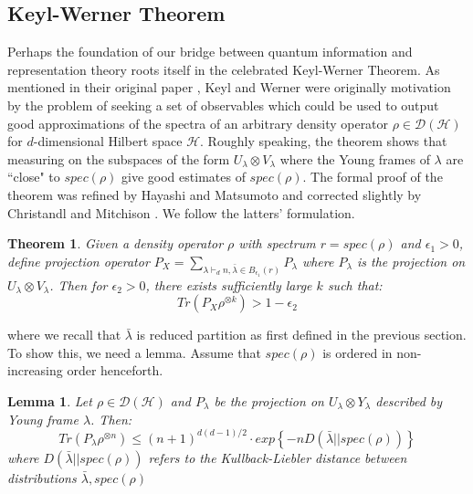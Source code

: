 \documentclass[12pt]{article}%
\newtheorem{thm}{Theorem}
\newtheorem{lemma}{Lemma}
\begin{document}
\subsection{Keyl-Werner Theorem}
Perhaps the foundation of our bridge between quantum information and representation theory roots itself in the celebrated Keyl-Werner Theorem. As mentioned in their original paper \cite{KW}, Keyl and Werner were originally motivation by the problem of seeking a set of observables which could be used to output good approximations of the spectra of an arbitrary density operator $\rho \in \mathcal{D}(\mathcal{H})$ for $d$-dimensional Hilbert space $\mathcal{H}$.  Roughly speaking, the theorem shows that measuring on the subspaces of the form $U_\lambda \otimes V_\lambda$ where the Young frames of $\lambda$ are ``close" to $spec(\rho)$ give good estimates of $spec(\rho)$. The formal proof of the theorem was refined by Hayashi and Matsumoto \cite{HM} and corrected slightly by Christandl and Mitchison \cite{CM}. We follow the latters' formulation.

\begin{thm} \label{keyl}
  Given a density operator $\rho$ with spectrum $r  = spec(\rho)$ and $\epsilon_1 > 0$, define projection operator $P_X = \sum_{\lambda \vdash_d n, \bar{\lambda} \in B_{\epsilon_1}(r)} P_{\lambda}$ where $P_{\lambda}$ is the projection on $U_{\lambda} \otimes V_{\lambda}$. Then for $\epsilon_2 > 0$, there exists sufficiently large $k$ such that:
  $$  Tr(P_X \rho^{\otimes k}) > 1 - \epsilon_2$$
\end{thm}

\noindent where we recall that $\bar{\lambda}$ is reduced partition as first defined in the previous section. To show this, we need a lemma.  Assume that $spec(\rho)$ is ordered in non-increasing order henceforth.

\begin{lemma}
  Let $\rho \in \mathcal{D}(\mathcal{H})$ and $P_{\lambda}$ be the projection on $U_{\lambda} \otimes Y_{\lambda}$ described by Young frame $\lambda$. Then:
  $$Tr(P_{\lambda}\rho^{\otimes n}) \leq (n+1)^{d(d-1)/2} \cdot exp \left\{-n D(\bar{\lambda}||spec(\rho)) \right\} $$
  where $D(\bar{\lambda}||spec(\rho))$ refers to the Kullback-Liebler distance between distributions $\bar{\lambda},spec(\rho)$
\end{lemma}
\end{document}
